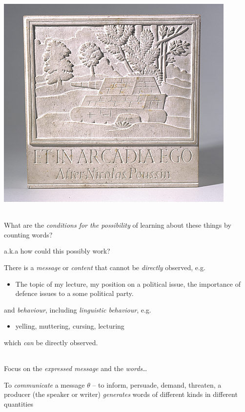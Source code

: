 \documentclass[11pt,compress,professionalfonts]{beamer}
\newcommand{\ita}{\begin{itemize}}
\newcommand{\itm}{\item[]}
\newcommand{\itz}{\end{itemize}}
\begin{document}
\centerline{\includegraphics[scale=4]{pictures/etinarcadiaego}}

~\\
What are the \textit{conditions for the possibility} of learning about these things by counting words?

\vfill
a.k.a how could this possibly work?


There is a \textsl{message} or \textit{content} that cannot be \textit{directly} observed, e.g. 
\ita 
\itm The topic of my lecture, my position on a political issue, the importance of defence issues to a some political party.
\itz
 and \textit{behaviour}, including \textsl{linguistic behaviour}, e.g. 
\ita
\itm yelling, muttering, cursing, lecturing 
\itz
which \textit{can} be directly observed.

~\\
Focus on the \textit{expressed message} and the \textit{words}\ldots


To \textsl{communicate} a message $\theta$ -- to inform, persuade, demand, threaten, a producer (the speaker or writer) \textsl{generates} words of different kinds in different quantities
\end{document}
